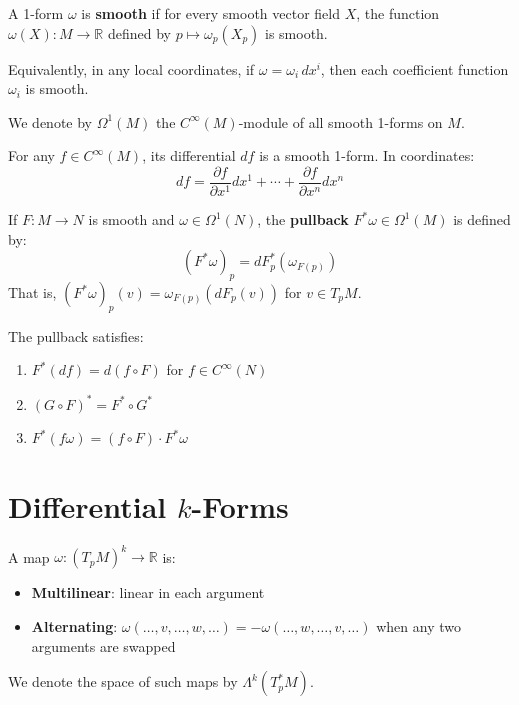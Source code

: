 \begin{definition}
    A 1-form $\omega$ is \textbf{smooth} if for every smooth vector field $X$, the function $\omega(X): M \to \mathbb{R}$ defined by $p \mapsto \omega_p(X_p)$ is smooth.

    Equivalently, in any local coordinates, if $\omega = \omega_i \, dx^i$, then each coefficient function $\omega_i$ is smooth.
\end{definition}

\begin{definition}
    We denote by $\Omega^1(M)$ the $C^\infty(M)$-module of all smooth 1-forms on $M$.
\end{definition}

\begin{example}
    For any $f \in C^\infty(M)$, its differential $df$ is a smooth 1-form. In coordinates:
    \[
        df = \frac{\partial f}{\partial x^1} dx^1 + \cdots + \frac{\partial f}{\partial x^n} dx^n
    \]
\end{example}

\begin{definition}
    If $F: M \to N$ is smooth and $\omega \in \Omega^1(N)$, the \textbf{pullback} $F^*\omega \in \Omega^1(M)$ is defined by:
    \[
        (F^*\omega)_p = dF_p^*(\omega_{F(p)})
    \]
    That is, $(F^*\omega)_p(v) = \omega_{F(p)}(dF_p(v))$ for $v \in T_pM$.
\end{definition}

\begin{proposition}
    The pullback satisfies:
    \begin{enumerate}
        \item $F^*(df) = d(f \circ F)$ for $f \in C^\infty(N)$
        \item $(G \circ F)^* = F^* \circ G^*$
        \item $F^*(f\omega) = (f \circ F) \cdot F^*\omega$
    \end{enumerate}
\end{proposition}

\section{Differential $k$-Forms}

\begin{definition}
    A map $\omega: (T_pM)^k \to \mathbb{R}$ is:
    \begin{itemize}
        \item \textbf{Multilinear}: linear in each argument
        \item \textbf{Alternating}: $\omega(\ldots, v, \ldots, w, \ldots) = -\omega(\ldots, w, \ldots, v, \ldots)$ when any two arguments are swapped
    \end{itemize}
    We denote the space of such maps by $\Lambda^k(T_p^*M)$.
\end{definition}

